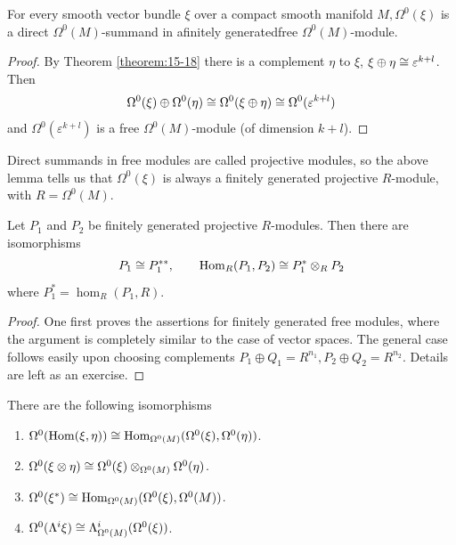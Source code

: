 \begin{lemma}\label{lemma:16-11}
  For every smooth vector bundle $\xi$ over a compact smooth manifold $M, \Omega^0(\xi)$ is 
  a direct $\Omega^0(M)$-summand in afinitely generatedfree $\Omega^0(M)$-module.
\end{lemma}


\begin{proof}
  By Theorem \ref{theorem:15-18} there is a complement $\eta$ to $\xi$, $\xi\oplus\eta\cong \varepsilon^{k+l}$. Then 
  \[
    \Omega^0(\xi)\oplus\Omega^0(\eta) \cong 
    \Omega^0(\xi\oplus\eta)\cong 
    \Omega^0(\varepsilon^{k+l})
  \]
  and $\Omega^0(\varepsilon^{k+l})$ is a free $\Omega^0(M)$-module (of dimension $k+l$).
\end{proof}

Direct summands in free modules are called projective modules, so the above
lemma tells us that $\Omega^0(\xi)$ is always a finitely generated projective $R$-module,
with $R = \Omega^0(M)$.

\begin{lemma}\label{lemma:16-12}
  Let $P_1$ and $P_2$ be finitely generated projective $R$-modules. Then there are isomorphisms
  \[
    P_1\cong P_1^{**}, \qquad \operatorname{Hom}_R(P_1, P_2)\cong P_1^*\otimes_R P_2
  \]
  where $P_1^*=\hom_R(P_1, R)$.
\end{lemma}

\begin{proof}
  One first proves the assertions for finitely generated free modules, where
  the argument is completely similar to the case of vector spaces. The general case
  follows easily upon choosing complements $P_1\oplus Q_1=R^{n_1}, P_2\oplus Q_2=R^{n_2}$.
  Details are left as an exercise.
\end{proof}

\begin{theorem}\label{theorem:16-13}
  There are the following isomorphisms
  \begin{enumerate}
    \item $\Omega^0(\operatorname{Hom}(\xi, \eta))\cong \operatorname{Hom}_{\Omega^0(M)}(\Omega^0(\xi), \Omega^0(\eta))$.
    \item $\Omega^0(\xi\otimes\eta) \cong \Omega^0(\xi)\otimes_{\Omega^0(M)}\Omega^0(\eta)$.
    \item $\Omega^0(\xi^*)\cong \operatorname{Hom}_{\Omega^0(M)}(\Omega^0(\xi), \Omega^0(M))$.
    \item $\Omega^0(\Lambda^i\xi) \cong \Lambda^i_{\Omega^0(M)}(\Omega^0(\xi))$.
  \end{enumerate}
\end{theorem}


